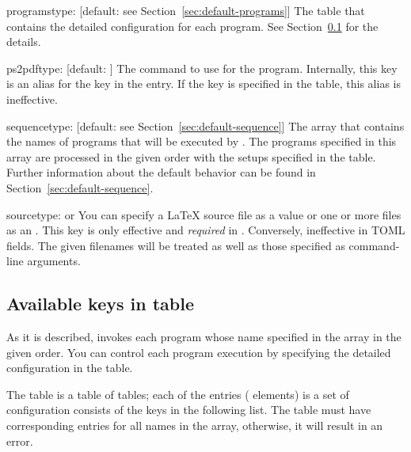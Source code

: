 \documentclass{llmk-doc}
\begin{document}
\begin{confkey}{programs}{type: }
  [default: see Section~\ref{sec:default-programs}]
The table that contains the detailed configuration for each program. See
Section~\ref{sec:keys-in-programs} for the details.
\end{confkey}

\begin{confkey}{ps2pdf}{type: }[default: ]
The command to use for the  program. Internally, this key is
an alias for the  key in the  entry. If the
 key is specified in the  table, this alias is
ineffective.
\end{confkey}

\begin{confkey}{sequence}{type: }
  [default: see Section~\ref{sec:default-sequence}]
The array that contains the names of programs that will be executed by
. The programs specified in this array are processed in the given
order with the setups specified in the  table. Further
information about the default behavior can be found in
Section~\ref{sec:default-sequence}.
\end{confkey}

\begin{confkey}{source}{type:  or }
You can specify a {\LaTeX} source file as a  value or one or more
files as an . This key is only effective and
\emph{required} in . Conversely, ineffective in TOML fields.
The given filenames will be treated as well as those specified as command-line
arguments.
\end{confkey}

\subsection{Available keys in  table}
\label{sec:keys-in-programs}

As it is described,  invokes each program whose name specified in
the  array in the given order. You can control each program
execution by specifying the detailed configuration in the 
table.

The  table is a table of tables; each of the entries (\aka
elements) is a set of configuration consists of the keys in the following list.
The  table must have corresponding entries for all names in the
 array, otherwise, it will result in an error.
\end{document}
